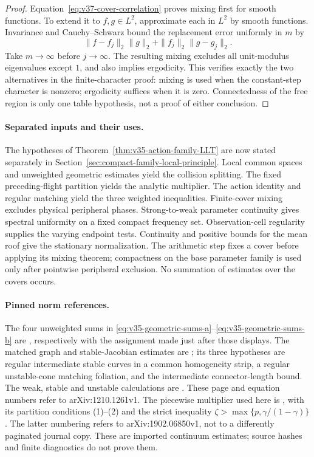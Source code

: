 \begin{proof}
Equation~\eqref{eq:v37-cover-correlation} proves mixing first for smooth
functions. To extend it to $f,g\in L^2$, approximate each in $L^2$ by
smooth functions. Invariance and Cauchy--Schwarz bound the replacement
error uniformly in $m$ by
\[
 \|f-f_j\|_2\|g\|_2+\|f_j\|_2\|g-g_j\|_2.
\]
Take $m\to\infty$ before $j\to\infty$. The resulting mixing excludes
all unit-modulus eigenvalues except $1$, and also implies ergodicity.
This verifies exactly the two alternatives in the finite-character
proof: mixing is used when the constant-step character is nonzero;
ergodicity suffices when it is zero. Connectedness of the free region
is only one table hypothesis, not a proof of either conclusion.
\end{proof}

\paragraph{Separated inputs and their uses.}
The hypotheses of Theorem~\ref{thm:v35-action-family-LLT} are now stated
separately in Section~\ref{sec:compact-family-local-principle}.
Local common spaces and unweighted geometric estimates yield the
collision splitting. The fixed preceding-flight partition yields the
analytic multiplier. The action identity and regular matching yield
the three weighted inequalities. Finite-cover mixing excludes physical
peripheral phases. Strong-to-weak parameter continuity gives spectral
uniformity on a fixed compact frequency set. Observation-cell
regularity supplies the varying endpoint tests. Continuity and positive
bounds for the mean roof give the stationary normalization. The
arithmetic step fixes a cover before applying its mixing theorem;
compactness on the base parameter family is used only after pointwise
peripheral exclusion. No summation of estimates over the covers occurs.

\paragraph{Pinned norm references.}
The four unweighted sums in
\eqref{eq:v35-geometric-sums-a}--\eqref{eq:v35-geometric-sums-b} are
\cite[Lemma 3.2(a)--(d), p.\ 12]{DZ}, respectively with the assignment
made just after those displays. The matched graph and stable-Jacobian
estimates are \cite[Lemma 3.3, pp.\ 13--14]{DZ}; its three hypotheses
are regular intermediate stable curves in a common homogeneity strip,
a regular unstable-cone matching foliation, and the intermediate
connector-length bound. The weak, stable and unstable calculations are
\cite[Proposition 4.1, equations (4.1)--(4.3), (4.7)--(4.11),
(4.14), (4.18)]{DZ}. These page and equation numbers refer to
arXiv:1210.1261v1. The piecewise multiplier used here is
\cite[Lemma 3.3(b), p.\ 13]{DPZ}, with its partition conditions (1)--(2)
and the strict inequality $\zeta>\max\{p,\gamma/(1-\gamma)\}$.
The latter numbering refers to arXiv:1902.06850v1, not to a differently
paginated journal copy. These are imported continuum estimates;
source hashes and finite diagnostics do not prove them.
